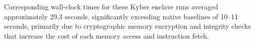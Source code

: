 
Corresponding wall-clock times for these Kyber enclave runs averaged approximately 29.3 seconds, significantly exceeding native baselines of 10--11 seconds, primarily due to cryptographic memory encryption and integrity checks that increase the cost of each memory access and instruction fetch.




